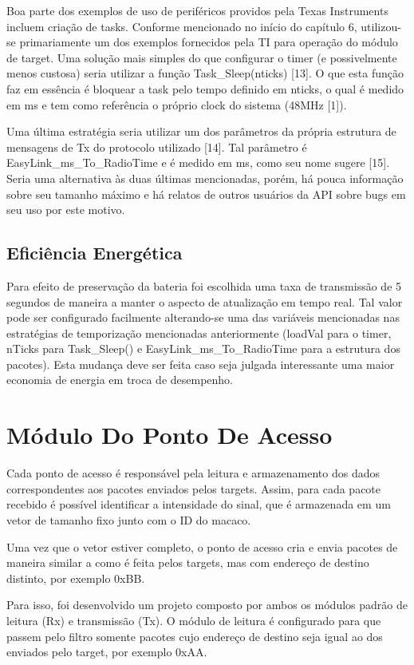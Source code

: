 Boa parte dos exemplos de uso de periféricos providos pela Texas Instruments incluem criação de tasks. Conforme mencionado no início do capítulo 6, utilizou-se primariamente um dos exemplos fornecidos pela TI para operação do módulo de target. Uma solução mais simples do que configurar o timer (e possivelmente menos custosa) seria utilizar a função Task_Sleep(nticks) [13]. O que esta função faz em essência é bloquear a task pelo tempo definido em nticks, o qual é medido em ms e tem como referência o próprio clock do sistema (48MHz [1]).

Uma última estratégia seria utilizar um dos parâmetros da própria estrutura de mensagens de Tx do protocolo utilizado [14]. Tal parâmetro é EasyLink_ms_To_RadioTime e é medido em ms, como seu nome sugere [15]. Seria uma alternativa às duas últimas mencionadas, porém, há pouca informação sobre seu tamanho máximo e há relatos de outros usuários da API sobre bugs em seu uso por este motivo.

\subsection{Eficiência Energética}

Para efeito de preservação da bateria foi escolhida uma taxa de transmissão de 5 segundos de maneira a manter o aspecto de atualização em tempo real. Tal valor pode ser configurado facilmente alterando-se uma das variáveis mencionadas nas estratégias de temporização mencionadas anteriormente (loadVal para o timer, nTicks para Task_Sleep() e EasyLink_ms_To_RadioTime para a estrutura dos pacotes). Esta mudança deve ser feita caso seja julgada interessante uma maior economia de energia em troca de desempenho.

\section{Módulo Do Ponto De Acesso}

Cada ponto de acesso é responsável pela leitura e armazenamento dos dados correspondentes aos pacotes enviados pelos targets. Assim, para cada pacote recebido é possível identificar a intensidade do sinal, que é armazenada em um vetor de tamanho fixo junto com o ID do macaco.

Uma vez que o vetor estiver completo, o ponto de acesso cria e envia pacotes de maneira similar a como é feita pelos targets, mas com endereço de destino distinto, por exemplo 0xBB.

Para isso, foi desenvolvido um projeto composto por ambos os módulos padrão de leitura (Rx) e transmissão (Tx). O módulo de leitura é configurado para que passem pelo filtro somente pacotes cujo endereço de destino seja igual ao dos enviados pelo target, por exemplo 0xAA.

